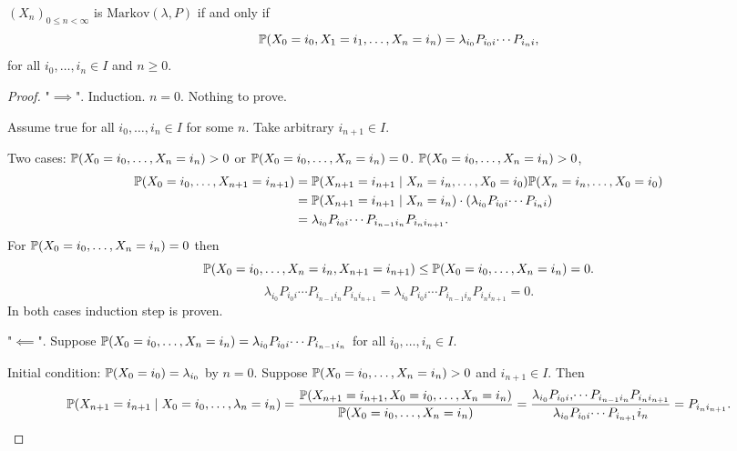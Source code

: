 \documentclass[10pt, a4paper]{article}
\begin{document}
\begin{theorem}
    $(X_n)_{0 \leq n < \infty}$ is $\mathrm{Markov}(\lambda, P)$ if and only if
    \[
    \P(X_0 = i_0, X_1 = i_1, \dotsc, X_n = i_n) = \lambda_{i_0}P_{i_0i}\dotsi P_{i_ni},
    \]
    for all $i_0, \dotsc, i_n \in I$ and $n \geq 0$.

    \begin{proof}
        "$\implies$".
        Induction.
        $n = 0$.
        Nothing to prove.

        Assume true for all $i_0, \dotsc, i_n \in I$ for some $n$.
        Take arbitrary $i_{n + 1} \in I$.

        Two cases:
        $\P(X_0 = i_0, \dotsc, X_n = i_n) > 0$ or $\P(X_0 = i_0, \dotsc, X_n = i_n) = 0$.
        $\P(X_0 = i_0, \dotsc, X_n = i_n) > 0$,
        \begin{align*}
            \P(X_0 = i_0, \dotsc, X_{n + 1} = i_{n + 1}) &= \P(X_{n + 1} = i_{n + 1} \mid X_n = i_n, \dotsc, X_0 = i_0)\P(X_n = i_n, \dotsc, X_0 = i_0) \\
            &= \P(X_{n + 1} = i_{n + 1} \mid X_n = i_n)\cdot(\lambda_{i_0}P_{i_0i}\dotsi P_{i_ni}) \\
            &= \lambda_{i_0}P_{i_0i}\dotsi P_{i_{n - 1}i_n}P_{i_ni_{n + 1}}.
        \end{align*}
        For $\P(X_0 = i_0, \dotsc, X_n = i_n) = 0$ then
        \[
        \P(X_0 = i_0, \dotsc, X_n = i_n, X_{n + 1} = i_{n + 1}) \leq \P(X_0 = i_0, \dotsc, X_n = i_n) = 0.
        \]
        \[
        \lambda_{i_0}P_{i_0i} \dotsi P_{i_{n - 1}i_n}P_{i_ni_{n + 1}} = \lambda_{i_0}P_{i_0i} \dotsi P_{i_{n - 1}i_n}P_{i_ni_{n + 1}} = 0.
        \]
        In both cases induction step is proven.

        "$\impliedby$".
        Suppose $\P(X_0 = i_0, \dotsc, X_n = i_n) = \lambda_{i_0}P_{i_0i}\dotsi P_{i_{n - 1}i_n}$ for all $i_0, \dotsc, i_n \in I$.

        Initial condition:
        $\P(X_0 = i_0) = \lambda_{i_0}$ by $n = 0$.
        Suppose $\P(X_0 = i_0, \dotsc, X_n = i_n) > 0$ and $i_{n + 1} \in I$.
        Then
        \[
        \P(X_{n + 1} = i_{n + 1} \mid X_0 = i_0, \dotsc, \lambda_n = i_n) = \frac{\P(X_{n + 1} = i_{n + 1}, X_0 = i_0, \dotsc, X_n = i_n)}{\P(X_0 = i_0, \dotsc, X_n = i_n)} = \frac{\lambda_{i_0}P_{i_0i}, \dotsi P_{i_{n - 1}i_n}P_{i_ni_{n + 1}}}{\lambda_{i_0}P_{i_0i}\dotsi P_{i_{n + 1}}i_n} = P_{i_ni_{n + 1}}.
        \]
    \end{proof}
\end{theorem}
\end{document}

